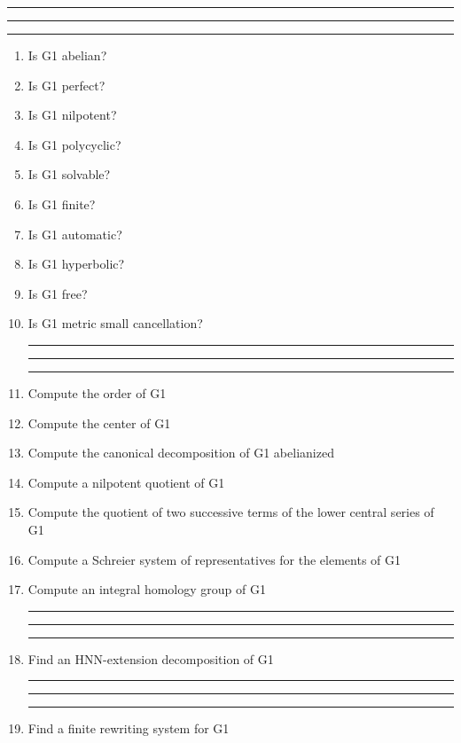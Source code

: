 
\bigskip
\hrule\hrule\hrule

\begin{enumerate}

\item Is G1 abelian?

\item Is G1 perfect?

\item Is G1 nilpotent?

\item Is G1 polycyclic?

\item Is G1 solvable?

\item Is G1 finite?

\item Is G1 automatic?

\item Is G1 hyperbolic?

\item Is G1 free?

\item Is G1 metric small cancellation?

\bigskip
\hrule\hrule\hrule

\item Compute the order of G1

\item Compute the center of G1

\item Compute the canonical decomposition of G1 abelianized

\item Compute a nilpotent quotient of G1

\item Compute the quotient of two successive terms of the lower central
series of G1

\item Compute a Schreier system of representatives for the elements of G1

\item Compute an integral homology group of G1

\bigskip
\hrule\hrule\hrule

\item Find an HNN-extension decomposition of G1

\bigskip
\hrule\hrule\hrule
\item Find a finite rewriting system for G1


\end{enumerate}
